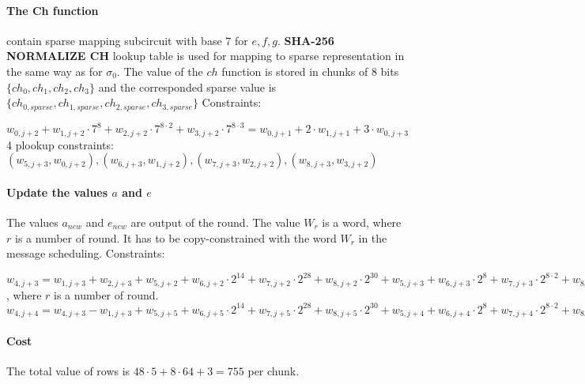 \paragraph{The Ch function}
contain sparse mapping subcircuit with base $7$ for $e, f ,g$.
\textbf{SHA-256 NORMALIZE CH} lookup table is used for mapping to sparse representation in the same way as for $\sigma_0$.
The value of the $ ch $ function is stored in chunks of $8$ bits $\{ch_0, ch_1, ch_2, ch_3 \}$ and the corresponded sparse value is $\{ch_{0, sparse}, ch_{1, sparse}, ch_{2, sparse}, ch_{3, sparse} \}$
Constraints:
\begin{center}
    $w_{0, j + 2} + w_{1, j + 2} \cdot 7^8 + w_{2, j + 2} \cdot 7^{8 \cdot 2} + w_{3, j + 2} \cdot 7^{8 \cdot 3} = w_{0, j + 1} + 2 \cdot w_{1, j + 1} + 3 \cdot w_{0, j + 3}$ \\
    4 plookup constraints: $( w_{5, j + 3}, w_{0, j + 2}), ( w_{6, j + 3}, w_{1, j + 2}), (w_{7, j + 3}, w_{2, j + 2}), (w_{8, j + 3}, w_{3, j + 2})$ \\
\end{center}

\paragraph{Update the values $a$ and $e$}
The values $a_{new}$ and $e_{new}$ are output of the round.
The value $W_r$ is a word, where $r$ is a number of round.
It has to be copy-constrained with the word $W_r$ in the message scheduling.
Constraints:
\begin{center}
    $w_{4, j + 3} = w_{1, j + 3} + w_{2, j + 3} + w_{5, j + 2} + w_{6, j + 2} \cdot 2^{14} + w_{7, j + 2} \cdot  2^{28} + w_{8, j + 2} \cdot 2^{30} + w_{5, j + 3} + w_{6, j + 3} \cdot 2^8 + w_{7, j + 3} \cdot 2^{8 \cdot 2} + w_{8, j + 3} \cdot 2^{8 \cdot 3} + k[r] + w_{3, j + 3}$, where $r$ is a number of round. \\
    $w_{4, j + 4} = w_{4, j + 3} - w_{1, j + 3} + w_{5, j + 5} + w_{6, j + 5} \cdot 2^{14} + w_{7, j + 5} \cdot  2^{28} + w_{8, j + 5} \cdot 2^{30} + w_{5, j + 4} + w_{6, j + 4} \cdot 2^8 + w_{7, j + 4} \cdot 2^{8 \cdot 2} + w_{8, j + 4} \cdot 2^{8 \cdot 3}$
\end{center}

\paragraph{Cost}
The total value of rows is $48 \cdot 5 + 8 \cdot 64 + 3 = 755$ per chunk.

